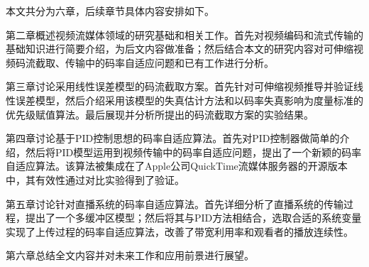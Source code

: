 本文共分为六章，后续章节具体内容安排如下。

第二章概述视频流媒体领域的研究基础和相关工作。首先对视频编码和流式传输的基础知识进行简要介绍，为后文内容做准备；然后结合本文的研究内容对可伸缩视频码流截取、传输中的码率自适应问题和已有工作进行分析。

第三章讨论采用线性误差模型的码流截取方案。首先针对可伸缩视频推导并验证线性误差模型，然后介绍采用该模型的失真估计方法和以码率失真影响为度量标准的优先级赋值算法。最后展现并分析所提出的码流截取方案的实验结果。

第四章讨论基于PID控制思想的码率自适应算法。首先对PID控制器做简单的介绍，然后将PID模型运用到视频传输中的码率自适应问题，提出了一个新颖的码率自适应算法。该算法被集成在了Apple公司QuickTime流媒体服务器的开源版本中，其有效性通过对比实验得到了验证。

第五章讨论针对直播系统的码率自适应算法。首先详细分析了直播系统的传输过程，提出了一个多缓冲区模型；然后将其与PID方法相结合，选取合适的系统变量实现了上传过程的码率自适应算法，改善了带宽利用率和观看者的播放连续性。

第六章总结全文内容并对未来工作和应用前景进行展望。